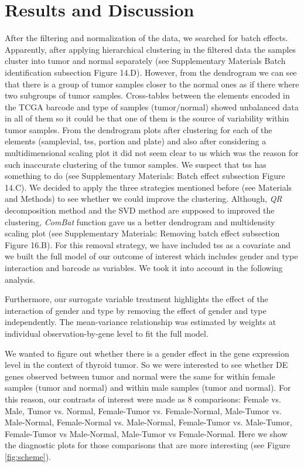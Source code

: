 \documentclass[9pt,twocolumn,twoside]{gsajnl}
\begin{document}
\section*{Results and Discussion}

After the filtering and normalization of the data, we searched for batch effects. Apparently, after applying hierarchical clustering in the filtered data the samples cluster into tumor and normal separately (see Supplementary Materials Batch identification subsection Figure 14.D). However, from the dendrogram we can see that there is a group of tumor samples closer to the normal ones as if there where two subgroups of tumor samples. Cross-tables between the elements encoded in the TCGA barcode and type of samples (tumor/normal) showed unbalanced data in all of them so it could be that one of them is the source of variability within tumor samples. From the dendrogram plots after clustering for each of the elements (samplevial, tss, portion and plate) and also after considering a multidimensional scaling plot it did not seem clear to us which was the reason for such inaccurate clustering of the tumor samples. We suspect that tss has something to do (see Supplementary Materials: Batch effect subsection Figure 14.C). We decided to apply the three strategies mentioned before (see Materials and Methods) to see whether we could improve the clustering. Although, \textit{QR} decomposition method and the SVD method are supposed to improved the clustering, \textit{ComBat} function gave us a better dendrogram and multidensity scaling plot (see Supplementary Materials: Removing batch effect subsection Figure 16.B). For this removal strategy, we have included tss as a covariate and we built the full model of our outcome of interest which includes gender and type interaction and barcode as variables. We took it into account in the following analysis.

Furthermore, our surrogate variable treatment highlights the effect of the interaction of gender and type by removing the effect of gender and type independently. The mean-variance relationship was estimated by weights at individual observation-by-gene level to fit the full model.  

We wanted to figure out whether there is a gender effect in the gene expression level in the context of thyroid tumor. So we were interested to see whether DE genes observed between tumor and normal were the same for within female samples (tumor  and normal) and within male samples (tumor and normal). For this reason, our contrasts of interest were made as 8 comparisons: 
Female vs. Male, Tumor vs. Normal, Female-Tumor vs. Female-Normal,  Male-Tumor vs. Male-Normal, Female-Normal vs. Male-Normal, Female-Tumor vs. Male-Tumor, Female-Tumor vs Male-Normal, Male-Tumor vs Female-Normal. Here we show the diagnostic plots for those comparisons that are more interesting (see Figure \ref{fig:scheme}).
\end{document}
